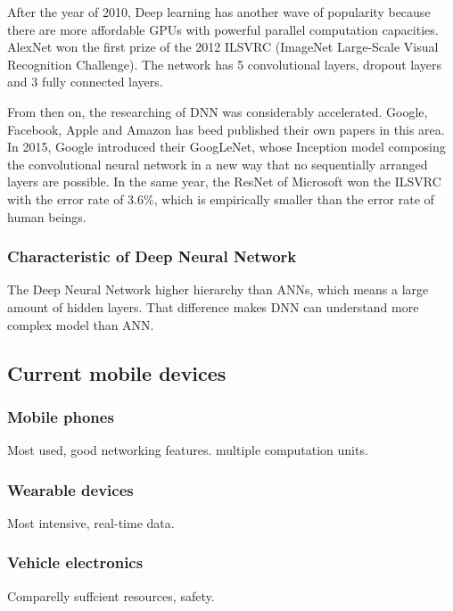 \documentclass[article]{aaltoseries}
\begin{document}
After the year of 2010, Deep learning has another wave of popularity because there are more affordable GPUs with powerful 
parallel computation capacities. AlexNet\cite{NIPS2012_4824} won the first prize of 
the 2012 ILSVRC (ImageNet Large-Scale Visual Recognition Challenge). The network has 5 convolutional layers, dropout layers 
and 3 fully connected layers.

From then on, the researching of DNN was considerably accelerated. Google, Facebook, Apple and Amazon has beed published
their own papers in this area. In 2015, Google introduced their GoogLeNet\cite{GoogLeNet}, whose Inception model composing the convolutional 
neural network in a new way that no sequentially arranged layers are possible. In the same year, the ResNet\cite{ResNet} of Microsoft won 
the ILSVRC with the error rate of 3.6\%, which is empirically smaller than the error rate of human beings.




\subsubsection{Characteristic of Deep Neural Network}

The Deep Neural Network higher hierarchy than ANNs, which means a large amount of hidden layers\cite{MAL-006}. 
That difference makes DNN can understand more complex model than ANN.





\subsection{Current mobile devices} %

\subsubsection{Mobile phones}
Most used, good networking features. multiple computation units. 

\subsubsection{Wearable devices}
Most intensive, real-time data.

\subsubsection{Vehicle electronics}
Comparelly suffcient resources, safety.
\end{document}
